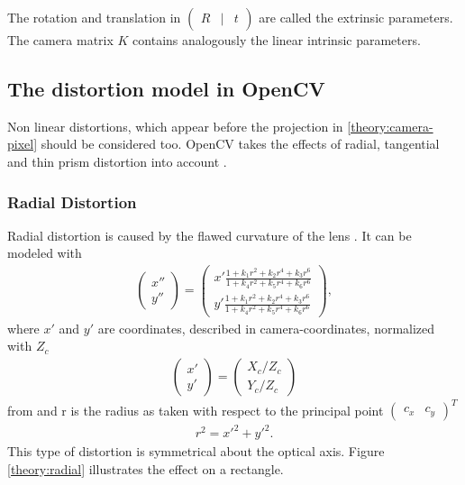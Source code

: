 The rotation and translation in $\begin{pmatrix}R&|&t\end{pmatrix}$ are called the extrinsic parameters. The camera matrix $K$ contains analogously the linear intrinsic parameters.

\subsection{The distortion model in OpenCV}
Non linear distortions, which appear before the projection in \ref{theory:camera-pixel} should be considered too.
OpenCV takes the effects of radial, tangential and thin prism distortion into account \cite{cv_calib}. 

\subsubsection{Radial Distortion}
Radial distortion is caused by the flawed curvature of the lens \cite{weng}.
It can be modeled with
\begin{align}
\begin{pmatrix}
x''\\
y''
\end{pmatrix}=
\begin{pmatrix}
x'\frac{1+k_1 r^2+k_2 r^4+k_3 r^6}{1+k_4 r^2+k_5r^4+k_6r^6}\\
y'\frac{1+k_1 r^2+k_2 r^4+k_3 r^6}{1+k_4 r^2+k_5r^4+k_6r^6}
\end{pmatrix}\label{theory:raddist},
\end{align}
where $x'$ and $y'$ are coordinates, described in camera-coordinates, normalized with $Z_c$
\begin{align*}
\begin{pmatrix}
x'\\
y'
\end{pmatrix}=
\begin{pmatrix}
X_c/Z_c\\
Y_c/Z_c
\end{pmatrix}
\end{align*}from
and r is the radius as taken with respect to the principal point $\begin{pmatrix}c_x&c_y\end{pmatrix}^T$
\begin{align*}
r^2 = x'^2 + y'^2.
\end{align*}
This type of distortion is symmetrical about the optical axis.
Figure \ref{theory:radial} illustrates the effect on a rectangle.
